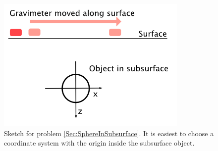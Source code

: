 \begin{figure}
\centering
\begin{minipage}[c]{0.5\textwidth}
\begin{center}
    \includegraphics[width=\textwidth]{Figures/Gravimetry/Gravimetry01_SphereSketch.png}
\end{center}
\caption{Sketch for problem \ref{Sec:SphereInSubsurface}. It is easiest to choose a coordinate system with the origin inside the subsurface object.}
\label{Fig:SphereInSubsurface}
\end{minipage}
\end{figure}

